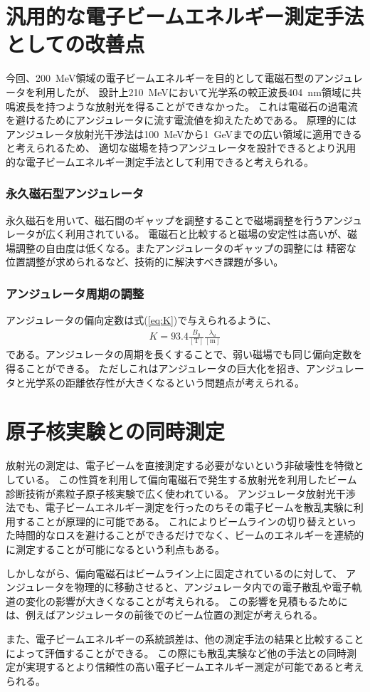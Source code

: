 \documentclass[a4paper,11pt,uplatex]{jsbook}
\begin{document}
\section{汎用的な電子ビームエネルギー測定手法としての改善点}
今回、200~MeV領域の電子ビームエネルギーを目的として電磁石型のアンジュレータを利用したが、
設計上210~MeVにおいて光学系の較正波長404~nm領域に共鳴波長を持つような放射光を得ることができなかった。
これは電磁石の過電流を避けるためにアンジュレータに流す電流値を抑えたためである。
原理的にはアンジュレータ放射光干渉法は100~MeVから1~GeVまでの広い領域に適用できると考えられるため、
適切な磁場を持つアンジュレータを設計できるとより汎用的な電子ビームエネルギー測定手法として利用できると考えられる。
\subsubsection{永久磁石型アンジュレータ}
永久磁石を用いて、磁石間のギャップを調整することで磁場調整を行うアンジュレータが広く利用されている。
電磁石と比較すると磁場の安定性は高いが、磁場調整の自由度は低くなる。またアンジュレータのギャップの調整には
精密な位置調整が求められるなど、技術的に解決すべき課題が多い。
\subsubsection{アンジュレータ周期の調整}
アンジュレータの偏向定数は式(\ref{eq:K})で与えられるように、
\begin{eqnarray}
  K = 93.4 \frac{B_0}{[\text{T}]}\frac{\lambda_u}{[\text{m}]}
\end{eqnarray}
である。アンジュレータの周期を長くすることで、弱い磁場でも同じ偏向定数を得ることができる。
ただしこれはアンジュレータの巨大化を招き、アンジュレータと光学系の距離依存性が大きくなるという問題点が考えられる。

\section{原子核実験との同時測定}
放射光の測定は、電子ビームを直接測定する必要がないという非破壊性を特徴としている。
この性質を利用して偏向電磁石で発生する放射光を利用したビーム診断技術が素粒子原子核実験で広く使われている。
アンジュレータ放射光干渉法でも、電子ビームエネルギー測定を行ったのちその電子ビームを散乱実験に利用することが原理的に可能である。
これによりビームラインの切り替えといった時間的なロスを避けることができるだけでなく、ビームのエネルギーを連続的に測定することが可能になるという利点もある。

しかしながら、偏向電磁石はビームライン上に固定されているのに対して、
アンジュレータを物理的に移動させると、アンジュレータ内での電子散乱や電子軌道の変化の影響が大きくなることが考えられる。
この影響を見積もるためには、例えばアンジュレータの前後でのビーム位置の測定が考えられる。

また、電子ビームエネルギーの系統誤差は、他の測定手法の結果と比較することによって評価することができる。
この際にも散乱実験など他の手法との同時測定が実現するとより信頼性の高い電子ビームエネルギー測定が可能であると考えられる。
\end{document}
